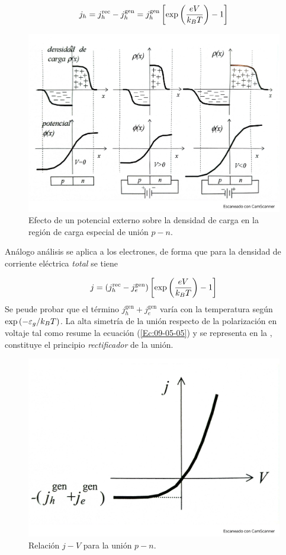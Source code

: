 \begin{equation}
	j_h = j_h^{\text{rec}}  - j_h^{\text{gen}}  = j_h^{\text{gen}} \left[ \exp\left( \frac{eV}{k_BT} \right)-1 \right] 
\end{equation}
\begin{figure}[h!] \centering
	\includegraphics[scale=0.25]{Cuerpo/Ch_09/Fotos libro 7.pdf}
	\caption{Efecto de un potencial externo sobre la densidad de carga en la región de carga especial de unión $p-n$.}
	\label{Fig:09-07}
\end{figure}
Análogo análisis se aplica a los electrones, de forma que para la densidad de corriente eléctrica \textit{total} se tiene 
 
\begin{equation}
	j=\left( j_h^{\text{rec}}-j_e^{\text{gen}} \right) \left[ \exp \left( \frac{eV}{k_BT} \right)-1 \right] \label{Ec:09-05-05}
\end{equation}
Se peude probar que el término $j_h^{\text{gen}}+j_e^{\text{gen}}$ varía con la temperatura según $\exp\left( -\varepsilon_g/k_BT \right)$. La alta simetría de la unión respecto de la polarización en voltaje tal como resume la ecuación (\ref{Ec:09-05-05}) y se representa en la , constituye el principio \textit{rectificador} de la unión.

\begin{figure}[h!] \centering
	\includegraphics[scale=0.25]{Cuerpo/Ch_09/Fotos libro 8.pdf}
	\caption{Relación $j-V$ para la unión $p-n$.}
	\label{Fig:09-08}
\end{figure}